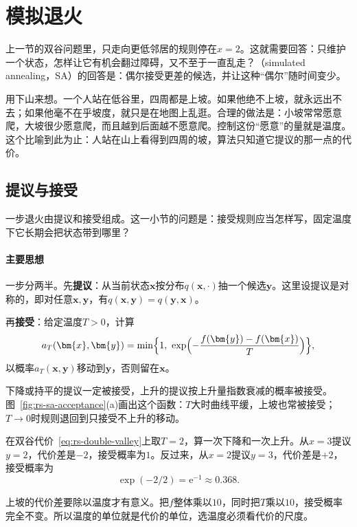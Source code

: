 \section{模拟退火}
\label{sec:rs-sa}

上一节的双谷问题里，只走向更低邻居的规则停在$x=2$。这就需要回答：只维护一个状态，怎样让它有机会翻过障碍，又不至于一直乱走？（simulated annealing，SA）的回答是：偶尔接受更差的候选，并让这种“偶尔”随时间变少。

用下山来想。一个人站在低谷里，四周都是上坡。如果他绝不上坡，就永远出不去；如果他毫不在乎坡度，就只是在地图上乱逛。合理的做法是：小坡常常愿意爬，大坡很少愿意爬，而且越到后面越不愿意爬。控制这份“愿意”的量就是温度。这个比喻到此为止：人站在山上看得到四周的坡，算法只知道它提议的那一点的代价。

\subsection{提议与接受}
\label{sec:rs-sa-accept}

一步退火由提议和接受组成。这一小节的问题是：接受规则应当怎样写，固定温度下它长期会把状态带到哪里？

\paragraph{主要思想}
一步分两半。先\textbf{提议}：从当前状态$\bm{x}$按分布$q(\bm{x},\cdot)$抽一个候选$\bm{y}$。这里设提议是对称的，即对任意$\bm{x},\bm{y}$，有$q(\bm{x},\bm{y})=q(\bm{y},\bm{x})$。

再\textbf{接受}：给定温度$T>0$，计算
\begin{equation}
 a_T(\bm{x},\bm{y})=\min\Bigl\{1,\ \exp\Bigl(-\frac{f(\bm{y})-f(\bm{x})}{T}\Bigr)\Bigr\},
 \label{eq:rs-metropolis}
\end{equation}
以概率$a_T(\bm{x},\bm{y})$移动到$\bm{y}$，否则留在$\bm{x}$。

下降或持平的提议一定被接受，上升的提议按上升量指数衰减的概率被接受。图~\ref{fig:rs-sa-acceptance}(a)画出这个函数：$T$大时曲线平缓，上坡也常被接受；$T\to0$时规则退回到只接受不上升的移动。

在双谷代价~\eqref{eq:rs-double-valley}上取$T=2$，算一次下降和一次上升。从$x=3$提议$y=2$，代价差是$-2$，接受概率为$1$。反过来，从$x=2$提议$y=3$，代价差是$+2$，接受概率为
\[
 \exp(-2/2)=\mathrm{e}^{-1}\approx0.368.
\]

上坡的代价差要除以温度才有意义。把$f$整体乘以$10$，同时把$T$乘以$10$，接受概率完全不变。所以温度的单位就是代价的单位，选温度必须看代价的尺度。

